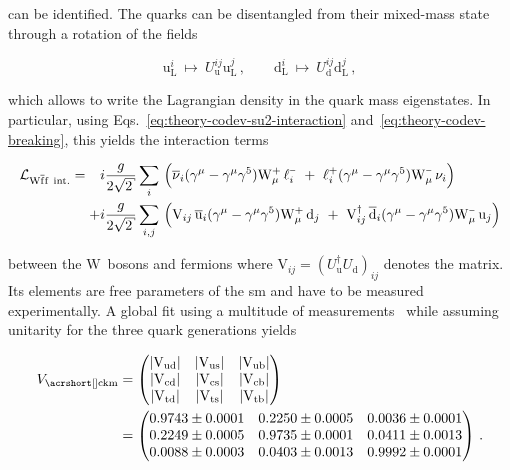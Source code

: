can be identified. The quarks can be disentangled from their mixed-mass state through a rotation of the fields 

\begin{equation}
\mathrm{u}^{i}_\mathrm{L}~\mapsto~ U^{ij}_\mathrm{u}\mathrm{u}^{j}_\mathrm{L}\,,\qquad \mathrm{d}^{i}_\mathrm{L}~\mapsto~ U^{ij}_\mathrm{d}\mathrm{d}^{j}_\mathrm{L}\,,
\end{equation}

which allows to write the Lagrangian density in the quark mass eigenstates. In particular, using Eqs.~\ref{eq:theory-codev-su2-interaction} and~\ref{eq:theory-codev-breaking}, this yields the interaction terms

\begin{align}
\mathcal{L}_{\mathrm{W}\bar{\mathrm{f}}\mathrm{f}~\mathrm{int.}}=\hphantom{+}i&\frac{g}{2\sqrt{2}}\sum_{i}\,\Big(\bar{\nu}_{i}(\gamma^\mu-\gamma^\mu\gamma^5) \mathrm{W}^{\rmplus}_\mu\,\ell^{\rmminus}_{i}~+~{\ell}^{\rmplus}_{i}(\gamma^\mu-\gamma^\mu\gamma^5) \mathrm{W}^{\rmminus}_\mu\,\nu_{i}\Big)\nonumber\\
+i&\frac{g}{2\sqrt{2}}\sum_{i,j}\,\Big(\mathrm{V}_{ij}\,\bar{\mathrm{u}}_{i}(\gamma^\mu-\gamma^\mu\gamma^5) \mathrm{W}^{\rmplus}_\mu\,\mathrm{d}_{j}~+~\mathrm{V}_{ij}^\dagger\,\bar{\mathrm{d}}_{i}(\gamma^\mu-\gamma^\mu\gamma^5) \mathrm{W}^{\rmminus}_\mu\,\mathrm{u}_{j}\Big) \label{eq:theory-qqW-int}
\end{align}

between the $\mathrm{W}$~bosons and fermions where $\mathrm{V}_{ij}=(U^\dagger_\mathrm{u}U_\mathrm{d})_{ij}$ denotes the  matrix. Its elements are free parameters of the \gls{sm} and have to be measured experimentally. A global fit using a multitude of measurements~\cite{Olive:2016xmw} while assuming unitarity for the three quark generations yields

\begin{align}
V_\mathrm{\gls{ckm}}&=\begin{pmatrix}
|\ckm{ud}| & |\ckm{us}| & |\ckm{ub}| \\
|\ckm{cd}| & |\ckm{cs}| & |\ckm{cb}| \\
|\ckm{td}| & |\ckm{ts}| & |\ckm{tb}| 
\end{pmatrix}\nonumber
\\&=
\begin{pmatrix}
0.9743\pm0.0001 & 0.2250\pm0.0005 & 0.0036\pm0.0001 \\
0.2249\pm0.0005 & 0.9735\pm0.0001 & 0.0411\pm0.0013 \\
0.0088\pm0.0003 & 0.0403\pm0.0013 & 0.9992\pm0.0001 
\end{pmatrix}\,. \label{eq:theory-ckm}
\end{align}


